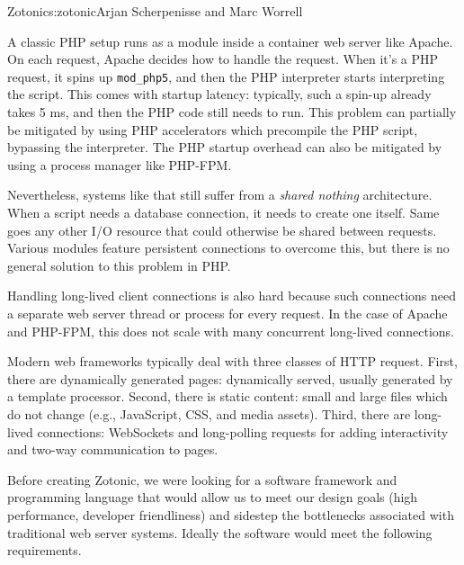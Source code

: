 \begin{aosachapter}{Zotonic}{s:zotonic}{Arjan Scherpenisse and Marc Worrell}

A classic PHP setup runs as a module inside a container web server like
Apache. On each request, Apache decides how to handle the request. When
it's a PHP request, it spins up \texttt{mod\_php5}, and then the PHP
interpreter starts interpreting the script. This comes with startup
latency: typically, such a spin-up already takes 5 ms, and then the PHP
code still needs to run. This problem can partially be mitigated by
using PHP accelerators which precompile the PHP script, bypassing the
interpreter. The PHP startup overhead can also be mitigated by using a
process manager like PHP-FPM.

Nevertheless, systems like that still suffer from a \emph{shared
nothing} architecture. When a script needs a database connection, it
needs to create one itself. Same goes any other I/O resource that could
otherwise be shared between requests. Various modules feature persistent
connections to overcome this, but there is no general solution to this
problem in PHP.

Handling long-lived client connections is also hard because such
connections need a separate web server thread or process for every
request. In the case of Apache and PHP-FPM, this does not scale with
many concurrent long-lived connections.


Modern web frameworks typically deal with three classes of HTTP request.
First, there are dynamically generated pages: dynamically served,
usually generated by a template processor. Second, there is static
content: small and large files which do not change (e.g., JavaScript,
CSS, and media assets). Third, there are long-lived connections:
WebSockets and long-polling requests for adding interactivity and
two-way communication to pages.

Before creating Zotonic, we were looking for a software framework and
programming language that would allow us to meet our design goals (high
performance, developer friendliness) and sidestep the bottlenecks
associated with traditional web server systems. Ideally the software
would meet the following requirements.

\begin{aosaitemize}


\end{aosaitemize}
\end{aosachapter}
